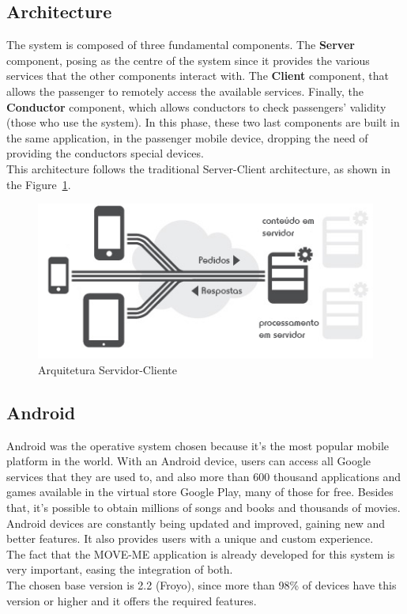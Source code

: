 \documentclass[9pt,a4paper]{extarticle}
\begin{document}
\begin{multicols}{2}
\subsection{Architecture}

The system is composed of three fundamental components. The \textbf{Server} component, posing as the centre of the system since it provides the various services that the other components interact with. The \textbf{Client} component, that allows the passenger to remotely access the available services. Finally, the \textbf{Conductor} component, which allows conductors to check passengers’ validity (those who use the system). In this phase, these two last components are built in the same application, in the passenger mobile device, dropping the need of providing the conductors special devices. 
\\This architecture follows the traditional Server-Client architecture, as shown in the Figure~\ref{fig:architecture}.

\begin{figure}[H]
\centerline{\includegraphics[scale=0.45]{architecture}}
    \caption{Arquitetura Servidor-Cliente}
    \label{fig:architecture}
\end{figure}

\subsection{Android}

Android was the operative system chosen because it’s the most popular mobile platform in the world. With an Android device, users can access all Google services that they are used to, and also more than 600 thousand applications and games available in the virtual store Google Play, many of those for free. Besides that, it’s possible to obtain millions of songs and books and thousands of movies. Android devices are constantly being updated and improved, gaining new and better features. It also provides users with a unique and custom experience.
\\The fact that the MOVE-ME application is already developed for this system is very important, easing the integration of both.
\\The chosen base version is 2.2 (Froyo), since more than 98\% of devices have this version or higher and it offers the required features. \cite{dashboards}


\end{multicols}
\end{document}
